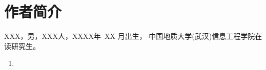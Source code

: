 ﻿
\chapter*{作者简介}
\xiaosi
\begin{spacing}{1.2}
XXX，男，XXX人，XXXX年~XX 月出生，
中国地质大学(武汉)信息工程学院在读研究生。
% 
\end{spacing}
\begin{enumerate}
\item 
\end{enumerate}
